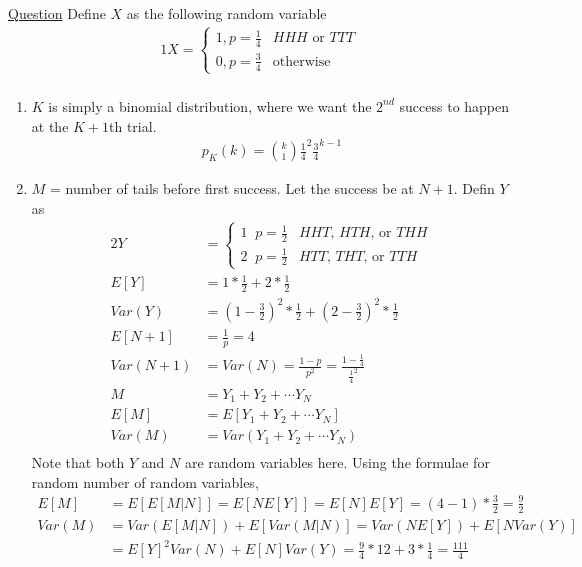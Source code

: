 \documentclass[11pt, a4paper]{article}
\begin{document}
\begin{enumerate}
        \hypertarget{a_threecoins}{\item} \hyperlink{q_threecoins}{Question}\newline
        Define $X$ as the following random variable
        \begin{alignat*}{1}
            X = \begin{cases} 1, p = \frac{1}{4} &\mbox{$HHH$ or $TTT$}\\
                             0, p = \frac{3}{4} &\mbox{otherwise} \end{cases}\\
        \end{alignat*}

        \begin{enumerate}
            \item $K$ is simply a binomial distribution, where we want the $2^{nd}$ success to happen at the $K+1$th trial.
            \begin{align*}
                p_{K}(k) = \binom{k}{1}\frac{1}{4}^{2}\frac{3}{4}^{k-1} \tag*{since the last trial is success}
            \end{align*}

            \item $M$ = number of tails before first success. Let the success be at $N+1$. Defin $Y$ as
            \begin{alignat*}{2}
                Y &= \begin{cases} 1\;\; p=\frac{1}{2} &\mbox{$HHT$, $HTH$, or $THH$}\\
                                 2\;\; p=\frac{1}{2} &\mbox{$HTT$, $THT$, or $TTH$} \end{cases}\\
                E[Y] &= 1 * \frac{1}{2} + 2 * \frac{1}{2}\\
                Var(Y) &= (1 - \frac{3}{2})^{2} * \frac{1}{2} + (2 - \frac{3}{2})^{2} * \frac{1}{2}\\
                E[N+1] &= \frac{1}{p} = 4\\
                Var(N+1) &= Var(N) = \frac{1-p}{p^{2}} = \frac{1 - \frac{1}{4}}{\frac{1}{4}^{2}}\\
                M &= Y_{1} + Y_{2} + \cdots Y_{N}\\
                E[M] &= E[Y_{1} + Y_{2} + \cdots Y_{N}]\\
                Var(M) &= Var(Y_{1} + Y_{2} + \cdots Y_{N})\\
            \end{alignat*}
            Note that both $Y$ and $N$ are random variables here. Using the formulae for random number of random variables,
            \begin{align*}
                E[M] &= E[E[M|N]] = E[NE[Y]] = E[N]E[Y] = (4-1) * \frac{3}{2} = \frac{9}{2}\\
                Var(M) &= Var(E[M|N]) + E[Var(M|N)] = Var(NE[Y]) + E[NVar(Y)]\\ 
                    &= E[Y]^{2}Var(N) + E[N]Var(Y) = \frac{9}{4} * 12 + 3 * \frac{1}{4} = \frac{111}{4}
            \end{align*}


\end{enumerate}
\end{enumerate}
\end{document}
